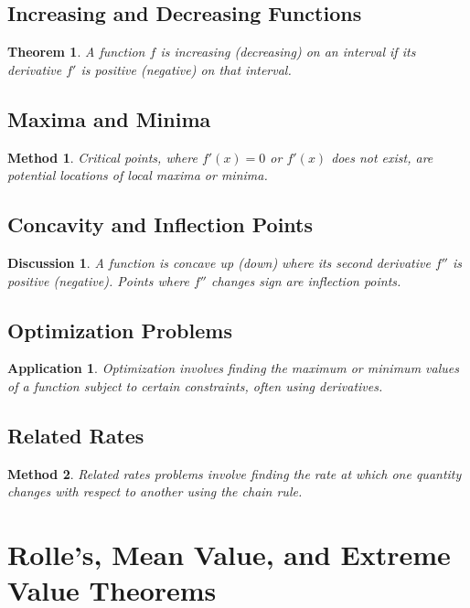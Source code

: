 \documentclass[a4paper,12pt]{book}
\newcounter{problem}
\newtheorem{theorem}{Theorem}
\newtheorem{application}{Application}
\newtheorem{method}{Method}
\newtheorem{discussion}{Discussion}
\begin{document}
\subsection{Increasing and Decreasing Functions}
\begin{theorem}
A function \( f \) is increasing (decreasing) on an interval if its derivative \( f' \) is positive (negative) on that interval.
\end{theorem}

\subsection{Maxima and Minima}
\begin{method}
Critical points, where \( f'(x) = 0 \) or \( f'(x) \) does not exist, are potential locations of local maxima or minima.
\end{method}

\subsection{Concavity and Inflection Points}
\begin{discussion}
A function is concave up (down) where its second derivative \( f'' \) is positive (negative). Points where \( f'' \) changes sign are inflection points.
\end{discussion}

\subsection{Optimization Problems}
\begin{application}
Optimization involves finding the maximum or minimum values of a function subject to certain constraints, often using derivatives.
\end{application}

\subsection{Related Rates}
\begin{method}
Related rates problems involve finding the rate at which one quantity changes with respect to another using the chain rule.
\end{method}


\section{Rolle's, Mean Value, and Extreme Value Theorems}
\end{document}
